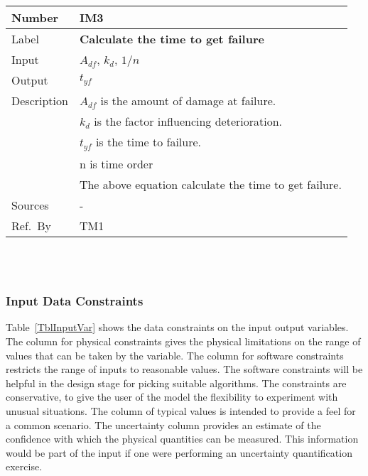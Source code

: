 \documentclass[12pt]{article}
\newcommand{\colAwidth}{0.13\textwidth}
\newcommand{\colBwidth}{0.82\textwidth}
\begin{document}
\noindent
\begin{minipage}{\textwidth}
\renewcommand*{\arraystretch}{1.5}
\begin{tabular}{| p{\colAwidth} | p{\colBwidth}|}
  \hline
  \rowcolor[gray]{0.9}
  Number& IM3\\
  \hline
  Label& \bf Calculate the time to get failure\\
  \hline
  Input & $A_{df}$, $k_d$, $1/n$ \\
  \hline
  Output & $t_{yf}$ \\
  \hline
  Description & $A_{df}$ is the amount of damage at failure. \\
              & $k_d$ is the factor influencing deterioration. \\
              & $t_{yf}$ is the time to failure. \\
  \hline
  & n is time order \\
  & The above equation calculate the time to get failure.\\
  \hline
  Sources& - \\
  \hline
  Ref.\ By & TM1\\
  \hline
\end{tabular}
\end{minipage}\\
~\newline

\subsubsection{Input Data Constraints} \label{sec_DataConstraints}    

Table~\ref{TblInputVar} shows the data constraints on the input output
variables.  The column for physical constraints gives the physical limitations
on the range of values that can be taken by the variable.  The column for
software constraints restricts the range of inputs to reasonable values.  The
software constraints will be helpful in the design stage for picking suitable
algorithms.  The constraints are conservative, to give the user of the model the
flexibility to experiment with unusual situations.  The column of typical values
is intended to provide a feel for a common scenario.  The uncertainty column
provides an estimate of the confidence with which the physical quantities can be
measured.  This information would be part of the input if one were performing an
uncertainty quantification exercise.
\end{document}
